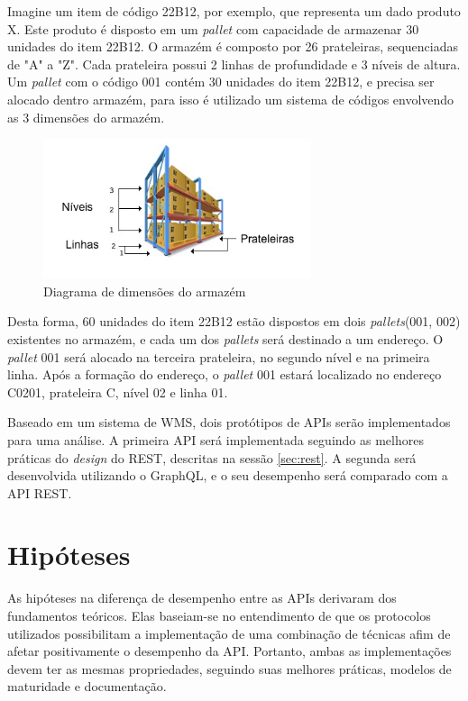 Imagine um item de código 22B12, por exemplo, que representa um dado produto X. Este produto é disposto em um \textit{pallet} com capacidade de armazenar 30 unidades do item 22B12. O armazém é composto por 26 prateleiras, sequenciadas de "A" a "Z". Cada prateleira possui 2 linhas de profundidade e 3 níveis de altura. Um \textit{pallet} com o código 001 contém 30 unidades do item 22B12, e precisa ser alocado dentro armazém, para isso é utilizado um sistema de códigos envolvendo as 3 dimensões do armazém.

\begin{figure}[htbp]
\centering
\includegraphics[width=0.7\textwidth]{figuras/rack.png}
\caption{Diagrama de dimensões do armazém}
\label{fig:rack}
\end{figure}

Desta forma, 60 unidades do item 22B12 estão dispostos em dois \textit{pallets}(001, 002) existentes no armazém, e cada um dos \textit{pallets} será destinado a um endereço. O \textit{pallet} 001 será alocado na terceira prateleira, no segundo nível e na primeira linha. Após a formação do endereço, o \textit{pallet} 001 estará localizado no endereço C0201, prateleira C, nível 02 e linha 01.

Baseado em um sistema de WMS, dois protótipos de APIs serão implementados para uma análise. A primeira API será implementada seguindo as melhores práticas do \textit{design} do REST, descritas na sessão \ref{sec:rest}. A segunda será desenvolvida utilizando o GraphQL, e o seu desempenho será comparado com a API REST.

\section{Hipóteses} \label{sechHipóteses}

As hipóteses na diferença de desempenho entre as APIs derivaram dos fundamentos teóricos. Elas baseiam-se no entendimento de que os protocolos utilizados possibilitam a implementação de uma combinação de técnicas afim de afetar positivamente o desempenho da API. Portanto, ambas as implementações devem ter as mesmas propriedades, seguindo suas melhores práticas, modelos de maturidade e documentação.

